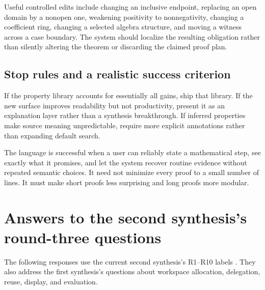 \documentclass[11pt,letterpaper]{article}
\theoremstyle{definition}
\theoremstyle{remark}
\begin{document}
Useful controlled edits include changing an inclusive endpoint, replacing an
open domain by a nonopen one, weakening positivity to nonnegativity, changing a
coefficient ring, changing a selected algebra structure, and moving a witness
across a case boundary. The system should localize the resulting obligation
rather than silently altering the theorem or discarding the claimed proof plan.

\subsection{Stop rules and a realistic success criterion}
If the property library accounts for essentially all gains, ship that library.
If the new surface improves readability but not productivity, present it as an
explanation layer rather than a synthesis breakthrough. If inferred properties
make source meaning unpredictable, require more explicit annotations rather
than expanding default search.

The language is successful when a user can reliably state a mathematical step,
see exactly what it promises, and let the system recover routine evidence
without repeated semantic choices. It need not minimize every proof to a small
number of lines. It must make short proofs less surprising and long proofs more
modular.

\section{Answers to the second synthesis's round-three questions}\label{sec:questions}

The following responses use the current second synthesis's R1--R10 labels
\cite{syn-b}. They also address the first synthesis's questions about workspace
allocation, delegation, reuse, display, and evaluation.
\end{document}
